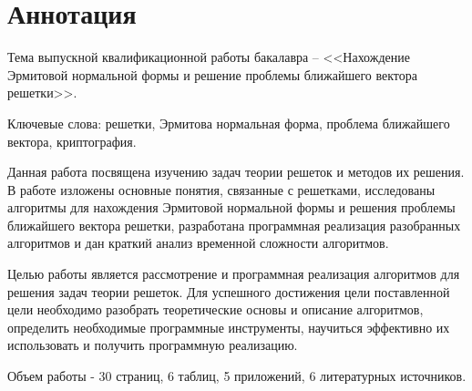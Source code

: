 \newpage
\setcounter{page}{2}

\section*{Аннотация}

Тема выпускной квалификационной работы бакалавра -- <<Нахождение Эрмитовой нормальной формы и решение проблемы ближайшего вектора решетки>>.

Ключевые слова: решетки, Эрмитова нормальная форма, проблема ближайшего вектора, криптография.

Данная работа посвящена изучению задач теории решеток и методов их решения. В работе изложены основные понятия, связанные с решетками, исследованы алгоритмы для нахождения Эрмитовой нормальной формы и решения проблемы ближайшего вектора решетки, разработана программная реализация разобранных алгоритмов и дан краткий анализ временной сложности алгоритмов.

Целью работы является рассмотрение и программная реализация алгоритмов для решения задач теории решеток. Для успешного достижения цели поставленной цели необходимо разобрать теоретические основы и описание алгоритмов, определить необходимые программные инструменты,  научиться эффективно их использовать и получить программную реализацию.

Объем работы - 30 страниц, 6 таблиц, 5 приложений, 6 литературных источников.

\clearpage